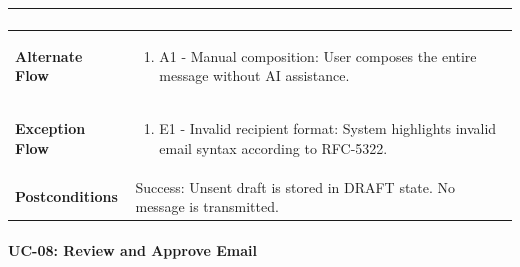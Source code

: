 \begin{longtable}{>{\raggedright\arraybackslash}p{}>{\raggedright\arraybackslash}p{}}
\begin{enumerate}[nosep,leftmargin=*,label=\arabic*.]
\end{enumerate} \\ \hline

\textbf{Alternate Flow} & \begin{enumerate}[nosep,leftmargin=*,label=\arabic*.]

    \item A1 - Manual composition: User composes the entire message without AI assistance.

\end{enumerate} \\ \hline

\textbf{Exception Flow} & \begin{enumerate}[nosep,leftmargin=*,label=\arabic*.]

    \item E1 - Invalid recipient format: System highlights invalid email syntax according to RFC-5322.

\end{enumerate} \\ \hline

\textbf{Postconditions} & Success: Unsent draft is stored in DRAFT state. No message is transmitted. \\ \hline

\end{longtable}

\endgroup





\paragraph*{UC-08: Review and Approve Email}

\begingroup

\small

\setlength{\tabcolsep}{5pt}

\renewcommand{\arraystretch}{1.1}

